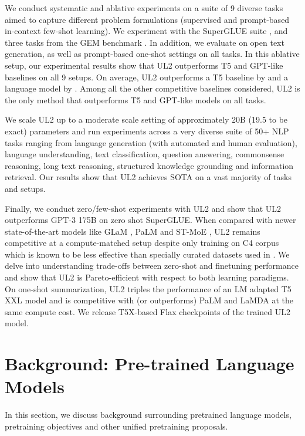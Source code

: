 \documentclass[10pt]{article}
\begin{document}
We conduct systematic and ablative experiments on a suite of 9 diverse tasks aimed to capture different problem formulations (supervised and prompt-based in-context few-shot learning). We experiment with the SuperGLUE suite \citep{wang2019superglue}, and three tasks from the GEM benchmark \citep{gehrmann2021gem}. In addition, we evaluate on open text generation, as well as prompt-based one-shot settings on all tasks. In this ablative setup, our experimental results show that UL2 outperforms T5 and GPT-like baselines on all 9 setups. On average, UL2 outperforms a T5 baseline by  and a language model by . Among all the other competitive baselines considered, UL2 is the only method that outperforms T5 and GPT-like models on all tasks. 

We scale UL2 up to a moderate scale setting of approximately 20B (19.5 to be exact) parameters and run experiments across a very diverse suite of 50+ NLP tasks ranging from language generation (with automated and human evaluation), language understanding, text classification, question answering, commonsense reasoning, long text reasoning, structured knowledge grounding and information retrieval. Our results show that UL2 achieves SOTA on a vast majority of tasks and setups. 

Finally, we conduct zero/few-shot experiments with UL2 and show that UL2 outperforms GPT-3 175B on zero shot SuperGLUE. When compared with newer state-of-the-art models like GLaM \citep{du2021glam}, PaLM \citep{chowdhery2022palm} and ST-MoE \citep{zoph2022designing}, UL2 remains competitive at a compute-matched setup despite only training on C4 corpus which is known to be less effective than specially curated datasets used in \citep{du2021glam,chowdhery2022palm}. We delve into understanding trade-offs between zero-shot and finetuning performance and show that UL2 is Pareto-efficient with respect to both learning paradigms. On one-shot summarization, UL2 triples the performance of an LM adapted T5 XXL model and is competitive with (or outperforms) PaLM and LaMDA at the same compute cost. We release T5X-based Flax checkpoints of the trained UL2 model.  
\newpage

\section{Background: Pre-trained Language Models}
In this section, we discuss background surrounding pretrained language models, pretraining objectives and other unified pretraining proposals.
\end{document}
